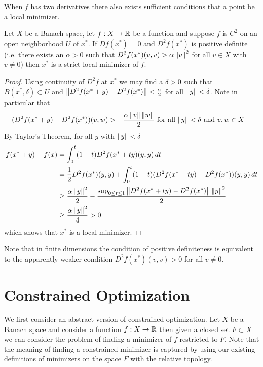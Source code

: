 When $f$ has two derivatives there also exists sufficient conditions
that a point be a local minimizer.
\begin{thm}\label{LocalMinimumAtPositiveDefiniteSecondDerivative}Let $X$ be a
  Banach space, let $f : X \to \mathbb{R}$ be a function and suppose $f$
  is $C^2$ on an open neighborhood $U$ of $x^*$.
  If $Df(x^*) = 0$ and $D^2f(x^*)$ is positive definite
  (i.e. there exists an $\alpha > 0$ such that $D^2f(x^*) (v,v) >
  \alpha \left \lVert v \right \rVert^2$ for all $v \in X$ with $v \neq 0$) then
  $x^*$ is a strict local minimizer of $f$.
\end{thm}
\begin{proof}
Using continuity of $D^2f$ at $x^*$ we may find a $\delta > 0$ such
that $B(x^*,
\delta) \subset U$ and $\left \lVert D^2f(x^* + y) - D^2f(x^*) \right \rVert
< \frac{\alpha}{2}$ for all $\left \lVert y \right \rVert < \delta$.  Note in particular
that 
\begin{align*}
(D^2f(x^* + y) - D^2f(x^*) )(v,w) &> -\frac{\alpha \left \lVert v \right \rVert
  \left \lVert w \right \rVert}{2} \text{ for all $\left \lVert y \right \rVert < \delta$ and $v,w \in X$}
\end{align*}  
By Taylor's Theorem, 
for all $y$ with $\left \lVert y \right \rVert < \delta$
\begin{align*}
f(x^* + y) - f(x) &= 
\int_0^t (1-t) D^2f(x^* + ty)(y,y) \, dt \\
&=\frac{1}{2} D^2f(x^*)(y,y) + \int_0^t (1-t) (D^2f(x^* + ty)
  -D^2f(x^*)) (y,y) \, dt  \\
&\geq \frac{\alpha \left \lVert y \right \rVert^2}{2} - \frac{\sup_{0 \leq t \leq 1}
  \left \lVert D^2f(x^* + ty) - D^2f(x^*) \right \rVert \left \lVert y \right \rVert^2}{2} \\
&\geq  \frac{\alpha
  \left \lVert y \right \rVert^2}{4} > 0\\
\end{align*}
which shows that $x^*$ is a local minimizer.
\end{proof}

Note that in finite dimensions the condition of positive definiteness
is equivalent to the apparently weaker condition $D^2f(x^*) (v,v) > 0$
for all $v \neq 0$.

\section{Constrained Optimization}

We first consider an abstract version of constrained
optimization.  Let $X$ be a Banach space and consider a function $f :
X \to \mathbb{R}$ then given a closed set $F \subset X$ we can consider
the problem of finding a minimizer of $f$ restricted to $F$.  Note
that the meaning of finding a constrained minimizer is captured by
using our existing definitions of minimizers on the space $F$ with the
relative topology.

